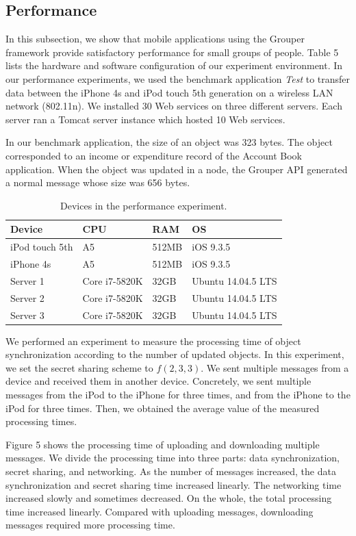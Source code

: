 \documentclass[sigconf]{acmart}
\begin{document}
\subsection{Performance}

In this subsection, we show that mobile applications using the Grouper framework provide satisfactory performance for small groups of people.
Table 5 lists the hardware and software configuration of our experiment environment.
In our performance experiments, we used the benchmark application \emph{Test} to transfer data between the iPhone 4s and iPod touch 5th generation on a wireless LAN network (802.11n).
We installed 30 Web services on three different servers.
Each server ran a Tomcat server instance which hosted 10 Web services.

In our benchmark application, the size of an object was 323 bytes.
The object corresponded to an income or expenditure record of the Account Book application.
When the object was updated in a node, the Grouper API generated a normal message whose size was 656 bytes.

\begin{table}[t]
	\small
	\centering  
	\caption{Devices in the performance experiment.}
	\begin{tabular}{llll}
		\hline
		\textbf{Device} & \textbf{CPU} & \textbf{RAM} & \textbf{OS} \\ \hline
		iPod touch 5th & A5 & 512MB & iOS 9.3.5 \\
		iPhone 4s & A5 & 512MB & iOS 9.3.5 \\
		Server 1 & Core i7-5820K & 32GB & Ubuntu 14.04.5 LTS \\
		Server 2 & Core i7-5820K & 32GB & Ubuntu 14.04.5 LTS \\
		Server 3 & Core i7-5820K & 32GB & Ubuntu 14.04.5 LTS \\ \hline
	\end{tabular}
\end{table}

We performed an experiment to measure the processing time of object synchronization according to the number of updated objects.
In this experiment, we set the secret sharing scheme to ${f(2, 3, 3)}$.
We sent multiple messages from a device and received them in another device. 
Concretely, we sent multiple messages from the iPod to the iPhone for three times, and from the iPhone to the iPod for three times.
Then, we obtained the average value of the measured processing times.

Figure 5 shows the processing time of uploading and downloading multiple messages.
We divide the processing time into three parts: data synchronization, secret sharing, and networking.
As the number of messages increased, the data synchronization and secret sharing time increased linearly. 
The networking time increased slowly and sometimes decreased.
On the whole, the total processing time increased linearly.
Compared with uploading messages, downloading messages required more processing time.
\end{document}
